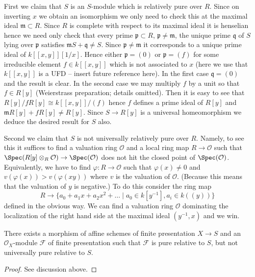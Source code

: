 \medskip\noindent
First we claim that $S$ is an $S$-module which is relatively pure
over $R$. Since on inverting $x$ we obtain an isomorphism we only need
to check this at the maximal ideal $\mathfrak m \subset R$. Since
$R$ is complete with respect to its maximal ideal it is henselian
hence we need only check that every prime $\mathfrak p \subset R$,
$\mathfrak p \not = \mathfrak m$, the unique prime $\mathfrak q$
of $S$ lying over $\mathfrak p$ satisfies
$\mathfrak mS + \mathfrak q \not = S$. Since $\mathfrak p \not = \mathfrak m$
it corresponds to a unique prime ideal of $k[[x, y]][1/x]$. Hence
either $\mathfrak p = (0)$ or $\mathfrak p = (f)$ for some
irreducible element $f \in k[[x, y]]$ which is not associated to $x$
(here we use that $k[[x, y]]$ is a UFD -- insert future reference here).
In the first case $\mathfrak q = (0)$ and the result is clear. In the
second case we may multiply $f$ by a unit so that $f \in R[y]$
(Weierstrass preparation; details omitted). Then it is easy to see that
$R[y]/fR[y] \cong k[[x, y]]/(f)$ hence $f$ defines a prime ideal
of $R[y]$ and $\mathfrak mR[y] + fR[y] \not = R[y]$.
Since $S \to R[y]$ is a universal homeomorphism we deduce the
desired result for $S$ also.

\medskip\noindent
Second we claim that $S$ is not universally relatively pure over $R$.
Namely, to see this it suffices to find a valuation ring
$\mathcal{O}$ and a local ring map $R \to \mathcal{O}$ such that
$\Spec(R[y] \otimes_R \mathcal{O}) \to \Spec(\mathcal{O})$
does not hit the closed point of $\Spec(\mathcal{O})$.
Equivalently, we have to find $\varphi : R \to \mathcal{O}$ such that
$\varphi(x) \not = 0$ and $v(\varphi(x)) > v(\varphi(xy))$ where $v$
is the valuation of $\mathcal{O}$.
(Because this means that the valuation of $y$ is negative.)
To do this consider the ring map
$$
R
\longrightarrow
\{a_0 + a_1 x + a_2 x^2 + \ldots \mid a_0 \in k[y^{-1}], a_i \in k((y))\}
$$
defined in the obvious way. We can find a valuation ring $\mathcal{O}$
dominating the localization of the right hand side at the maximal
ideal $(y^{-1}, x)$ and we win.

\begin{lemma}
\label{lemma-pure-not-universally-pure}
There exists a morphism of affine schemes of finite presentation
$X \to S$ and an $\mathcal{O}_X$-module $\mathcal{F}$ of finite presentation
such that $\mathcal{F}$ is pure relative to $S$, but not universally
pure relative to $S$.
\end{lemma}

\begin{proof}
See discussion above.
\end{proof}




